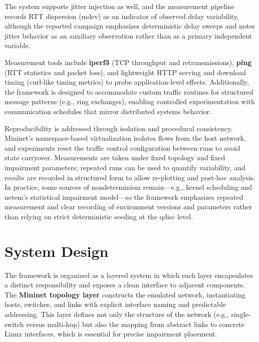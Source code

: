 \documentclass[11pt,a4paper]{article}
\begin{document}
The system supports jitter injection as well, and the measurement pipeline records RTT dispersion (mdev) as an indicator of observed delay variability, although the reported campaign emphasizes deterministic delay sweeps and notes jitter behavior as an auxiliary observation rather than as a primary independent variable.

Measurement tools include \textbf{iperf3} (TCP throughput and retransmissions), \textbf{ping} (RTT statistics and packet loss), and lightweight HTTP serving and download timing (curl-like timing metrics) to probe application-level effects. Additionally, the framework is designed to accommodate custom traffic routines for structured message patterns (e.g., ring exchanges), enabling controlled experimentation with communication schedules that mirror distributed systems behavior.

Reproducibility is addressed through isolation and procedural consistency. Mininet's namespace-based virtualization isolates flows from the host network, and experiments reset the traffic control configuration between runs to avoid state carryover. Measurements are taken under fixed topology and fixed impairment parameters; repeated runs can be used to quantify variability, and results are recorded in structured form to allow re-plotting and post-hoc analysis. In practice, some sources of nondeterminism remain—e.g., kernel scheduling and netem's statistical impairment model—so the framework emphasizes repeated measurement and clear recording of environment versions and parameters rather than relying on strict deterministic seeding at the qdisc level.

\section{System Design}

The framework is organized as a layered system in which each layer encapsulates a distinct responsibility and exposes a clean interface to adjacent components. The \textbf{Mininet topology layer} constructs the emulated network, instantiating hosts, switches, and links with explicit interface naming and predictable addressing. This layer defines not only the structure of the network (e.g., single-switch versus multi-hop) but also the mapping from abstract links to concrete Linux interfaces, which is essential for precise impairment placement.
\end{document}
